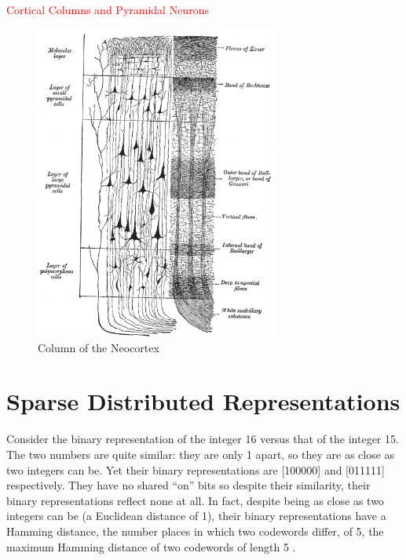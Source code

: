 \documentclass[oneside,12pt,openany]{book}
\begin{document}
	\textcolor{red}{Cortical Columns and Pyramidal Neurons}
	
	
	
	\begin{figure}[!ht]
		\centering
		\includegraphics[width=8cm]{images/ColumnOfNeocortex.png}
		\caption[Column of the Neocortex]{Column of the Neocortex\footnotemark}
		\label{CorticalColumn}
	\end{figure}
	
	\section{Sparse Distributed Representations}
	
	Consider the binary representation of the integer 16 versus that of the integer 15. The two numbers are quite similar: they are only 1 apart, so they are as close as two integers can be. Yet their binary representations are [100000] and [011111] respectively. They have no shared ``on'' bits so despite their similarity, their binary representations reflect none at all. In fact, despite being as close as two integers can be (a Euclidean distance of 1), their binary representations have a Hamming distance, the number places in which two codewords differ, of 5, the maximum Hamming distance of two codewords of length 5 \cite{Adams}. 
	
\end{document}
